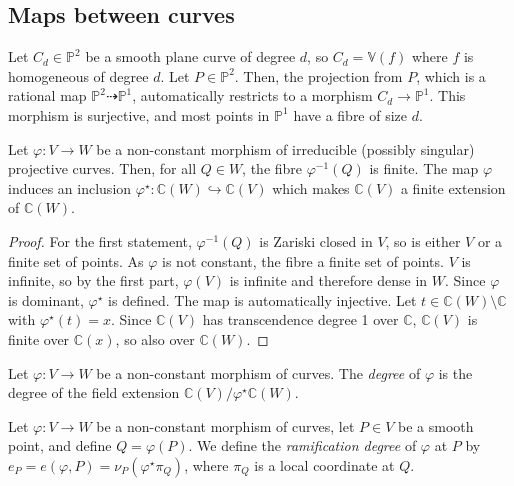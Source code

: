 \subsection{Maps between curves}
\begin{example}
    Let \( C_d \in \mathbb P^2 \) be a smooth plane curve of degree \( d \), so \( C_d = \mathbb V(f) \) where \( f \) is homogeneous of degree \( d \).
    Let \( P \in \mathbb P^2 \).
    Then, the projection from \( P \), which is a rational map \( \mathbb P^2 \dashrightarrow \mathbb P^1 \), automatically restricts to a morphism \( C_d \to \mathbb P^1 \).
    This morphism is surjective, and most points in \( \mathbb P^1 \) have a fibre of size \( d \).
\end{example}
\begin{proposition}
    Let \( \varphi \colon V \to W \) be a non-constant morphism of irreducible (possibly singular) projective curves.
    Then, for all \( Q \in W \), the fibre \( \varphi^{-1}(Q) \) is finite.
    The map \( \varphi \) induces an inclusion \( \varphi^\star \colon \mathbb C(W) \hookrightarrow \mathbb C(V) \) which makes \( \mathbb C(V) \) a finite extension of \( \mathbb C(W) \).
\end{proposition}
\begin{proof}
    For the first statement, \( \varphi^{-1}(Q) \) is Zariski closed in \( V \), so is either \( V \) or a finite set of points.
    As \( \varphi \) is not constant, the fibre a finite set of points.
    \( V \) is infinite, so by the first part, \( \varphi(V) \) is infinite and therefore dense in \( W \).
    Since \( \varphi \) is dominant, \( \varphi^\star \) is defined.
    The map is automatically injective.
    Let \( t \in \mathbb C(W) \setminus \mathbb C \) with \( \varphi^\star(t) = x \).
    Since \( \mathbb C(V) \) has transcendence degree 1 over \( \mathbb C \), \( \mathbb C(V) \) is finite over \( \mathbb C(x) \), so also over \( \mathbb C(W) \).
\end{proof}
\begin{definition}
    Let \( \varphi \colon V \to W \) be a non-constant morphism of curves.
    The \emph{degree} of \( \varphi \) is the degree of the field extension \( \mathbb C(V)/\varphi^\star\mathbb C(W) \).
\end{definition}
\begin{definition}
    Let \( \varphi \colon V \to W \) be a non-constant morphism of curves, let \( P \in V \) be a smooth point, and define \( Q = \varphi(P) \).
    We define the \emph{ramification degree} of \( \varphi \) at \( P \) by \( e_P = e(\varphi, P) = \nu_P(\varphi^\star \pi_Q) \), where \( \pi_Q \) is a local coordinate at \( Q \).    
\end{definition}
